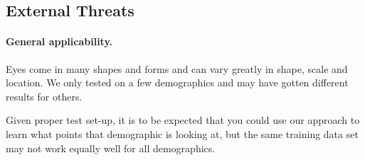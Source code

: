 \subsection{External Threats}
\paragraph{General applicability.}
Eyes come in many shapes and forms and can vary greatly in shape, scale and location.
We only tested on a few demographics and may have gotten different results for others.

Given proper test set-up, it is to be expected that you could use our approach to learn what points that demographic is looking at, but the same training data set may not work equally well for all demographics.
